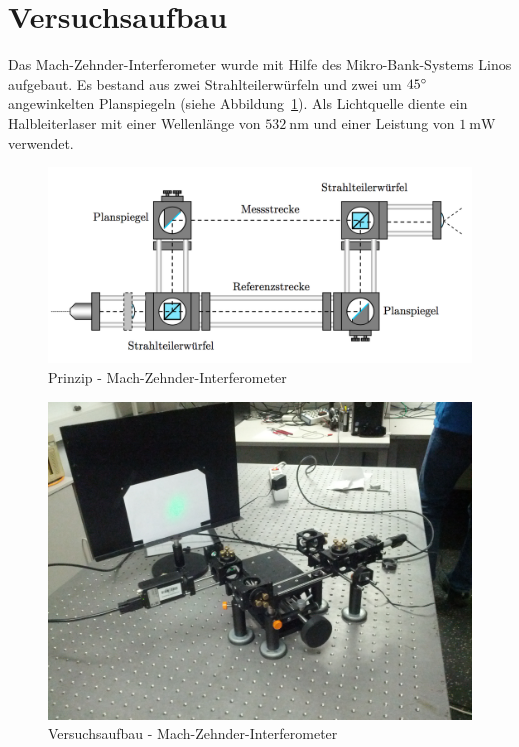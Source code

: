 \section{Versuchsaufbau}

Das Mach-Zehnder-Interferometer wurde mit Hilfe des Mikro-Bank-Systems Linos aufgebaut. Es bestand aus zwei Strahlteilerwürfeln und zwei um $45^\circ$ angewinkelten Planspiegeln (siehe Abbildung~\ref{fig:skizze}). Als Lichtquelle diente ein Halbleiterlaser mit einer Wellenlänge von $\SI{532}{\nano\meter}$ und einer Leistung von $\SI{1}{\milli\watt}$ verwendet.

\begin{figure}[h!]
	\includegraphics[width=\linewidth]{img/skizze_mzinterferometer.png}
	\caption{Prinzip - Mach-Zehnder-Interferometer}
	\label{fig:skizze}	
\end{figure}

\begin{figure}[h!]
	\includegraphics[width=\linewidth]{img/interferometer_aufbau}
	\caption{Versuchsaufbau - Mach-Zehnder-Interferometer}
	\label{fig:aufbau}	
\end{figure}

